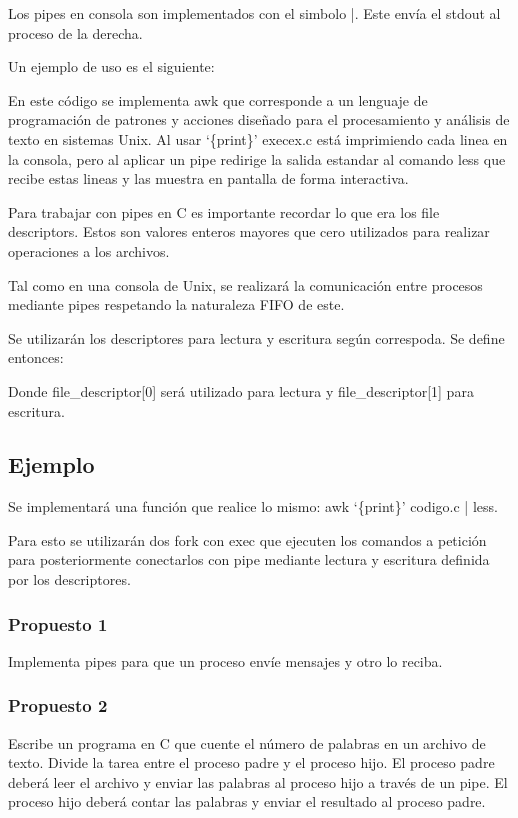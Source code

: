 \documentclass[journal]{IEEEtai}
\begin{document}
Los pipes en consola son implementados con el simbolo |. Este envía el stdout al proceso de la derecha.

Un ejemplo de uso es el siguiente:



En este código se implementa awk que corresponde a un lenguaje de programación de patrones y acciones diseñado para el procesamiento y análisis de texto en sistemas Unix. Al usar `\{print\}' execex.c está imprimiendo cada linea en la consola, pero al aplicar un pipe redirige la salida estandar al comando less que recibe estas lineas y las muestra en pantalla de forma interactiva.

Para trabajar con pipes en C es importante recordar lo que era los file descriptors. Estos son valores enteros mayores que cero utilizados para realizar operaciones a los archivos.

Tal como en una consola de Unix, se realizará la comunicación entre procesos mediante pipes respetando la naturaleza FIFO de este.

Se utilizarán los descriptores para lectura y escritura según correspoda. Se define entonces:



Donde file\_descriptor[0] será utilizado para lectura y file\_descriptor[1] para escritura.

\subsection{Ejemplo}

Se implementará una función que realice lo mismo: awk `\{print\}' codigo.c | less.

Para esto se utilizarán dos fork con exec que ejecuten los comandos a petición para posteriormente conectarlos con pipe mediante lectura y escritura definida por los descriptores.



\subsubsection{\textbf{Propuesto 1}} Implementa pipes para que un proceso envíe mensajes y otro lo reciba.

\subsubsection{\textbf{Propuesto 2}} Escribe un programa en C que cuente el número de palabras en un archivo de texto. Divide la tarea entre el proceso padre y el proceso hijo. El proceso padre deberá leer el archivo y enviar las palabras al proceso hijo a través de un pipe. El proceso hijo deberá contar las palabras y enviar el resultado al proceso padre.
\end{document}
